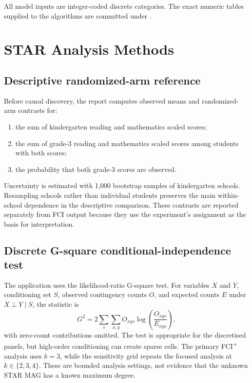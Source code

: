 \documentclass[11pt,a4paper,oneside]{report}
\newcommand{\FCIplus}{FCI\textsuperscript{+}}
\begin{document}
All model inputs are integer-coded discrete categories. The exact numeric
tables supplied to the algorithms are committed under
.

\chapter{STAR Analysis Methods}

\section{Descriptive randomized-arm reference}

Before causal discovery, the report computes observed means and
randomized-arm contrasts for:

\begin{enumerate}[leftmargin=2em]
  \item the sum of kindergarten reading and mathematics scaled scores;
  \item the sum of grade-3 reading and mathematics scaled scores among
        students with both scores;
  \item the probability that both grade-3 scores are observed.
\end{enumerate}

Uncertainty is estimated with 1,000 bootstrap samples of kindergarten schools.
Resampling schools rather than individual students preserves the main
within-school dependence in the descriptive comparison. These contrasts are
reported separately from FCI output because they use the experiment's
assignment as the basis for interpretation.

\section{Discrete G-square conditional-independence test}

The application uses the likelihood-ratio G-square test. For variables \(X\)
and \(Y\), conditioning set \(S\), observed contingency counts \(O\), and
expected counts \(E\) under \(X\perp Y\mid S\), the statistic is
\[
  G^2 = 2\sum_{s}\sum_{x,y}
        O_{xys}\log\left(\frac{O_{xys}}{E_{xys}}\right),
\]
with zero-count contributions omitted. The test is appropriate for the
discretised panels, but high-order conditioning can create sparse cells. The
primary \FCIplus{} analysis uses \(k=3\), while the sensitivity grid repeats
the focused analysis at \(k\in\{2,3,4\}\). These are bounded analysis settings,
not evidence that the unknown STAR MAG has a known maximum degree.
\end{document}
